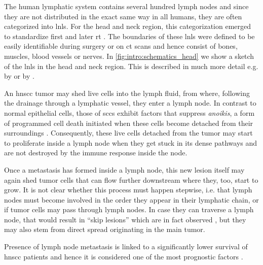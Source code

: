 \documentclass[\relativeRoot/main.tex]{subfiles}
\begin{document}
The human lymphatic system contains several hundred lymph nodes \cite{willard-mack_normal_2006} and since they are not distributed in the exact same way in all humans, they are often categorized into \glspl{lnl}. For the head and neck region, this categorization emerged to standardize first  \cite{robbins_standardizing_1991} and later \acrlong{rt} \cite{gregoire_ct-based_2003}. The boundaries of these \glspl{lnl} were defined to be easily identifiable during surgery or on \gls{ct} scans and hence consist of bones, muscles, blood vessels or nerves. In \cref{fig:intro:schematics_head} we show a sketch of the \glspl{lnl} in the head and neck region. This is described in much more detail e.g. by  or by .

An \gls{hnscc} tumor may shed live cells into the lymph fluid, from where, following the drainage through a lymphatic vessel, they enter a lymph node. In contrast to normal epithelial cells, those of \glspl{scc} exhibit factors that suppress \emph{anoikis}, a form of programmed cell death initiated when these cells become detached from their surroundings \cite{peltanova_effect_2019}. Consequently, these live cells detached from the tumor may start to proliferate inside a lymph node when they get stuck in its dense pathways and are not destroyed by the immune response inside the node.

Once a metastasis has formed inside a lymph node, this new lesion itself may again shed tumor cells that can flow further downstream where they, too, start to grow. It is not clear whether this process must happen stepwise, i.e. that lymph nodes must become involved in the order they appear in their lymphatic chain, or if tumor cells may pass through lymph nodes. In case they can traverse a lymph node, that would result in ``skip lesions'' which are in fact observed \cite{woolgar_topography_2007}, but they may also stem from direct spread originating in the main tumor.

Presence of lymph node metastasis is linked to a significantly lower survival of \gls{hnscc} patients and hence it is considered one of the most prognostic factors \cite{jones_level_1994,lim_distributions_2006,takes_staging_2004}.
\end{document}
